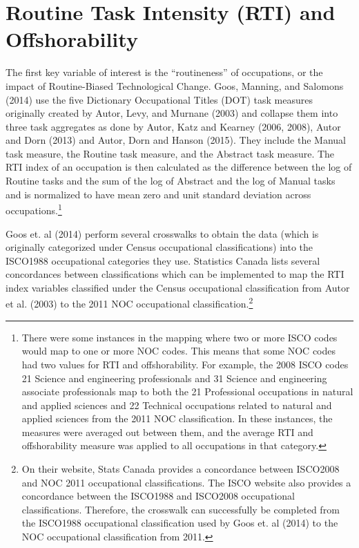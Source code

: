 \documentclass[undefended]{bumrp}
\begin{document}
\section{Routine Task Intensity (RTI) and Offshorability}

The first key variable of interest is the “routineness” of occupations, or the impact of Routine-Biased Technological Change. Goos, Manning, and Salomons (2014) use the five Dictionary Occupational Titles (DOT) task measures originally created by Autor, Levy, and Murnane (2003) and collapse them into three task aggregates as done by Autor, Katz and Kearney (2006, 2008), Autor and Dorn (2013) and Autor, Dorn and Hanson (2015). They include the Manual task measure, the Routine task measure, and the Abstract task measure. The RTI index of an occupation is then calculated as the difference between the log of Routine tasks and the sum of the log of Abstract and the log of Manual tasks and is normalized to have mean zero and unit standard deviation across occupations.\footnote{There were some instances in the mapping where two or more ISCO codes would map to one or more NOC codes. This means that some NOC codes had two values for RTI and offshorability. For example, the 2008 ISCO codes 21 Science and engineering professionals and 31 Science and engineering associate professionals map to both the 21 Professional occupations in natural and applied sciences and 22 Technical occupations related to natural and applied sciences from the 2011 NOC classification. In these instances, the measures were averaged out between them, and the average RTI and offshorability measure was applied to all occupations in that category.}

Goos et. al (2014) perform several crosswalks to obtain the data (which is originally categorized under Census occupational classifications) into the ISCO1988 occupational categories they use. Statistics Canada lists several concordances between classifications which can be implemented to map the RTI index variables classified under the Census occupational classification from Autor et al. (2003) to the 2011 NOC occupational classification.\footnote{On their website, Stats Canada provides a concordance between ISCO2008 and NOC 2011 occupational classifications. The ISCO website also provides a concordance between the ISCO1988 and ISCO2008 occupational classifications. Therefore, the crosswalk can successfully be completed from the ISCO1988 occupational classification used by Goos et. al (2014) to the NOC occupational classification from 2011.}
\end{document}
